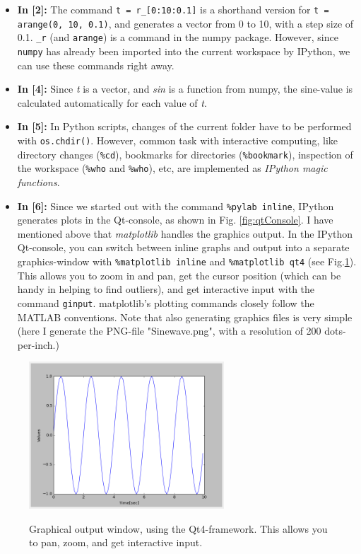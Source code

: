 \begin{itemize}
  \item \textbf{In [2]:} The command \lstinline{t = r_[0:10:0.1]} is a shorthand version for \lstinline{t = arange(0, 10, 0.1)}, and generates a vector from 0 to 10, with a step size of 0.1.  \lstinline{_r} (and \lstinline{arange}) is a command in the numpy package. However, since \lstinline{numpy} has already been imported into the current workspace by IPython, we can use these commands right away.
  \item \textbf{In [4]:} Since \emph{t} is a vector, and \emph{sin} is a function from numpy, the sine-value is calculated automatically for each value of \emph{t}.
  \item \textbf{In [5]:} In Python scripts, changes of the current folder have to be performed with \lstinline{os.chdir()}. However, common task with interactive computing, like directory changes (\lstinline{%cd}), bookmarks for directories (\lstinline{%bookmark}), inspection of the workspace (\lstinline{%who} and \lstinline{%who}), etc, are implemented as \emph{IPython magic functions}.
  \item \textbf{In [6]:} Since we started out with the command \lstinline{%pylab inline}, IPython generates plots in the Qt-console, as shown in Fig. \ref{fig:qtConsole}. I have mentioned above that \emph{matplotlib} handles the graphics output. In the IPython Qt-console, you can switch between inline graphs and output into a separate graphics-window with \lstinline{%matplotlib inline} and \lstinline{%matplotlib qt4} (see Fig.\ref{fig:qt4}). This allows you to zoom in and pan, get the cursor position (which can be handy in helping to find outliers), and get interactive input with the command \lstinline{ginput}. matplotlib's plotting commands closely follow the MATLAB conventions. Note that also generating graphics files is very simple (here I generate the PNG-file "Sinewave.png", with a resolution of 200 dots-per-inch.)
\end{itemize}

\begin{figure}
  \centering
  \includegraphics[width=0.65\textwidth]{../Images/qt4.png}\\
  \caption{Graphical output window, using the Qt4-framework. This allows you to pan, zoom, and get interactive input.}
  \label{fig:qt4}
\end{figure}


